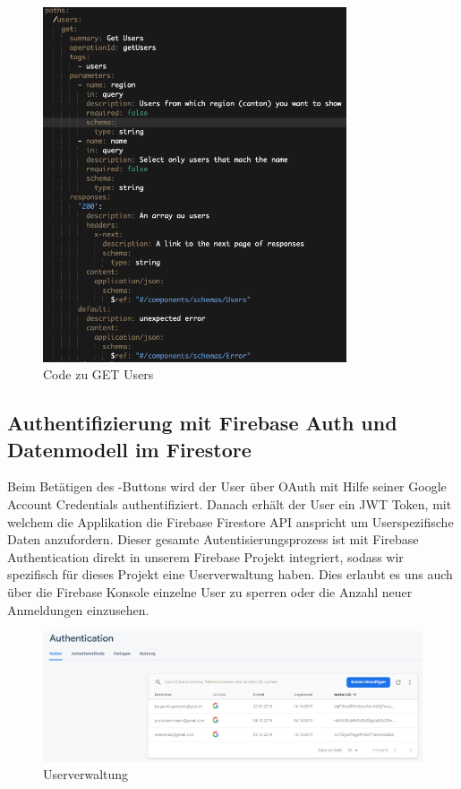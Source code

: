 \begin{figure}[H]
    \centering
    \includegraphics[width=0.8\textwidth]{images/swagger_code.png}
    \caption{Code zu GET Users}
    \label{fig:openapi_code}
\end{figure}

\subsection{Authentifizierung mit Firebase Auth und Datenmodell im Firestore}
Beim Betätigen des -Buttons wird der User über OAuth mit Hilfe seiner Google Account Credentials authentifiziert. Danach erhält der User ein JWT Token, mit welchem die Applikation die Firebase Firestore API anspricht um Userspezifische Daten anzufordern. Dieser gesamte Autentisierungsprozess ist mit Firebase Authentication direkt in unserem Firebase Projekt integriert, sodass wir spezifisch für dieses Projekt eine Userverwaltung haben. Dies erlaubt es uns auch über die Firebase Konsole einzelne User zu sperren oder die Anzahl neuer Anmeldungen einzusehen. 
\newpage
\begin{figure}[h]
    \centering
    \includegraphics[width=\textwidth]{images/firebaseauth.PNG}
    \caption{Userverwaltung}
    \label{fig:userverwaltung}
\end{figure}

